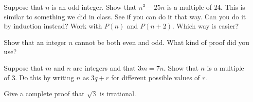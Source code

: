 \item Suppose that $n$ is an odd integer.
Show that $n^3 - 25n$ is a multiple of 24.
This is similar to something we did in class.
See if you can do it that way.
Can you do it by induction instead?
Work with $P(n)$ and $P(n+2)$.
Which way is easier?

\item Show that an integer $n$ cannot be both even and odd.
What kind of proof did you use?

\item Suppose that $m$ and $n$ are integers and that $3m = 7n$.
Show that $n$ is a multiple of 3.
Do this by writing $n$ as $3q+r$ for different possible values of $r$.

\item Give a complete proof that $\sqrt{3}$ is irrational.

\elist

\vfill          %
